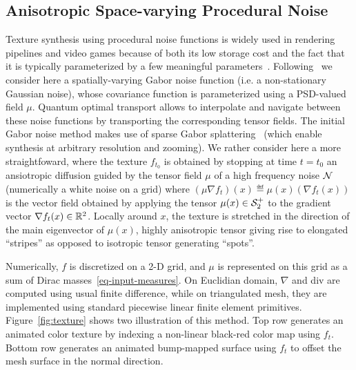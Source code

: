 
\subsection{Anisotropic Space-varying Procedural Noise}

Texture synthesis using procedural noise functions is widely used in rendering pipelines and video games because of both its low storage cost and the fact that it is typically parameterized by a few meaningful parameters~\cite{LagaeSurvey}. 
%
Following~\cite{LagaImproving} we consider here a spatially-varying Gabor noise function (i.e. a non-stationary Gaussian noise), whose covariance function is parameterized using a PSD-valued field $\mu$. 
%
Quantum optimal transport allows to interpolate and navigate between these noise functions by transporting the corresponding tensor fields. 
%
The initial Gabor noise method makes use of sparse Gabor splattering~\cite{LagaeSurvey} (which enable synthesis at arbitrary resolution and zooming). We rather consider here a more straightfoward, where the texture $f_{t_0}$ is obtained by stopping at time $t=t_0$ an ansiotropic diffusion guided by the tensor field $\mu$  of a high frequency noise $\mathcal{N}$ (numerically a white noise on a grid)
where $(\mu \nabla f_t)(x) \eqdef \mu(x) (\nabla f_t(x))$ is the vector field obtained by applying the tensor $\mu(x) \in \mathcal{S}_2^+$ to the gradient vector $\nabla f_t(x) \in \mathbb{R}^2$. 
%
Locally around $x$, the texture is stretched in the direction of the main eigenvector of $\mu(x)$,  highly anisotropic tensor giving rise to elongated ``stripes'' as opposed to isotropic tensor generating ``spots''. 

Numerically, $f$ is discretized on a 2-D grid, and $\mu$ is represented on this grid as a sum of Dirac masses~\eqref{eq-input-measures}. On Euclidian domain, $\nabla$ and div are computed using usual finite difference, while on triangulated mesh, they are implemented using standard piecewise linear finite element primitives. 
%
Figure~\ref{fig:texture} shows two illustration of this method. Top row generates an animated color texture by indexing a non-linear black-red color map using $f_t$. Bottom row generates an animated bump-mapped surface using $f_t$ to offset the mesh surface in the normal direction. 



